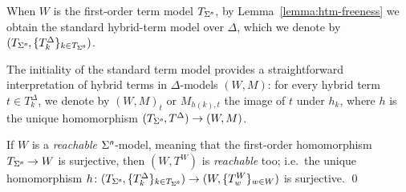 \documentclass[a4paper,UKenglish,cleveref,autoref]{lipics-v2019}
\begin{document}



When \(W\) is the first-order term model \(T_{\Sigma^{\text{\normalfont\sffamily\itshape n}}}\), by Lemma~\ref{lemma:htm-freeness} we obtain the standard hybrid-term model over \(\Delta\), which we denote by \((T_{\Sigma^{\text{\normalfont\sffamily\itshape n}}}, \{T^{\Delta}_{k}\}_{k \in T_{\Sigma^{\text{\normalfont\sffamily\itshape n}}}})\).

The initiality of the standard term model provides a straightforward interpretation of hybrid terms in \(\Delta\)-models \((W, M)\): for every hybrid term \(t \in T^{\Delta}_{k}\), we denote by \((W, M)_{t}\) or \(M_{h(k), t}\) the image of \(t\) under \(h_{k}\), where \(h\) is the unique homomorphism \((T_{\Sigma^{\text{\normalfont\sffamily\itshape n}}}, T^{\Delta}) \to (W, M)\).

\begin{proposition} 
  \label{proposition:tm-reachability}
  If\/ \(W\) is a \emph{reachable} \(\Sigma^{\text{\normalfont\sffamily\itshape n}}\)-model, meaning that the first-order homomorphism \(T_{\Sigma^{\text{\normalfont\sffamily\itshape n}}} \to W\) is surjective, then \((W, T^{W})\) is \emph{reachable} too; i.e.\ the unique homomorphism \(h \colon (T_{\Sigma^{\text{\normalfont\sffamily\itshape n}}}, \{ T^{\Delta}_{k} \}_{k \in T_{\Sigma^{\text{\normalfont\sffamily\itshape n}}}}) \to (W, \{ T^{W}_{w} \}_{w \in W})\) is surjective.
  \qed
\end{proposition}
\end{document}
